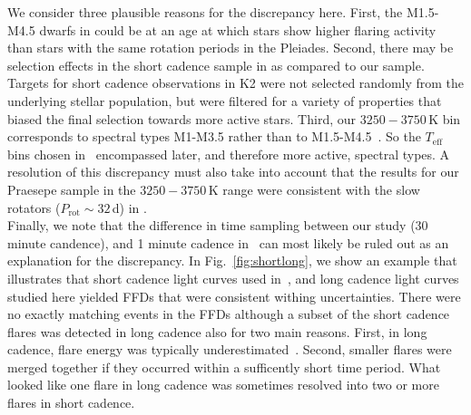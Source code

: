 \documentclass{aa}
\begin{document}
We consider three plausible reasons for the discrepancy here. First, the M1.5-M4.5 dwarfs in \citet{raetz2020} could be at an age at which stars show higher flaring activity than stars with the same rotation periods in the Pleiades. Second, there may be selection effects in the short cadence sample in \citet{raetz2020} as compared to our sample. Targets for short cadence observations in K2 were not selected randomly from the underlying stellar population, but were filtered for a variety of properties that biased the final selection towards more active stars. Third, our $3250-3750\,$K bin corresponds to spectral types M1-M3.5 rather than to M1.5-M4.5~\citep{pecaut_intrinsic_2013}. So the $T_\mathrm{eff}$ bins chosen in~\citet{raetz2020} encompassed later, and therefore more active, spectral types. A resolution of this discrepancy must also take into account that the results for our Praesepe sample in the  $3250-3750\,$K range were consistent with the slow rotators ($P_\mathrm{rot}\sim32\,$d) in \citet{raetz2020}.
\\
Finally, we note that the difference in time sampling between our study (30 minute candence), and 1 minute cadence in~\citet{raetz2020} can most likely be ruled out as an explanation for the discrepancy. In Fig.~\ref{fig:shortlong}, we show an example that illustrates that short cadence light curves used in~\citet{raetz2020}, and long cadence light curves studied here yielded FFDs that were consistent withing uncertainties. There were no exactly matching events in the FFDs although a subset of the short cadence flares was detected in long cadence also for two main reasons. First, in long cadence, flare energy was typically underestimated~\citep{yang_flaresampling_2018}. Second, smaller flares were merged together if they occurred within a sufficently short time period. What looked like one flare in long cadence was sometimes resolved into two or more flares in short cadence.
\end{document}
